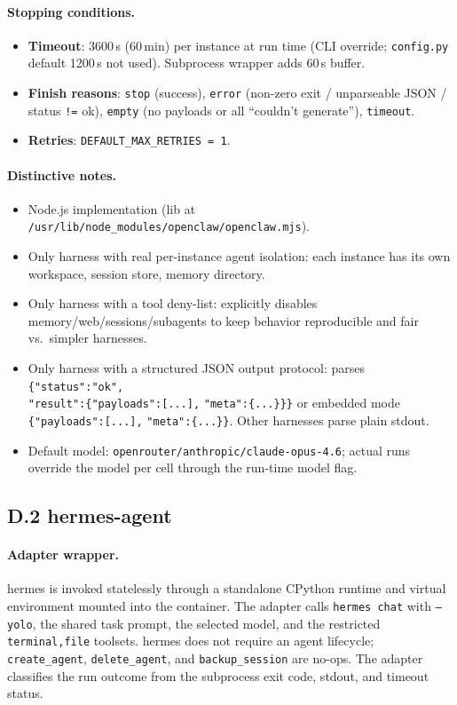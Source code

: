 \paragraph{Stopping conditions.}
\begin{itemize}
  \item \textbf{Timeout}: 3600\,s (60\,min) per instance at run time (CLI override; \texttt{config.py} default 1200\,s not used). Subprocess wrapper adds 60\,s buffer.
  \item \textbf{Finish reasons}: \texttt{stop} (success), \texttt{error} (non-zero exit / unparseable JSON / status \texttt{!=} ok), \texttt{empty} (no payloads or all ``couldn't generate''), \texttt{timeout}.
  \item \textbf{Retries}: \texttt{DEFAULT\_MAX\_RETRIES = 1}.
\end{itemize}

\paragraph{Distinctive notes.}
\begin{itemize}
  \item Node.js implementation (lib at \texttt{/usr/lib/}\allowbreak\texttt{node\_modules/openclaw/openclaw.mjs}).
  \item Only harness with real per-instance agent isolation: each instance has its own workspace, session store, memory directory.
  \item Only harness with a tool deny-list: explicitly disables memory/web/sessions/subagents to keep behavior reproducible and fair vs.\ simpler harnesses.
  \item Only harness with a structured JSON output protocol: parses \texttt{\{"status":"ok",} \\\texttt{"result":\{"payloads":[...],} \texttt{"meta":\{...\}\}\}} or embedded mode \texttt{\{"payloads":[...],} \texttt{"meta":\{...\}\}}. Other harnesses parse plain stdout.
  \item Default model: \texttt{openrouter/anthropic/claude-opus-4.6}; actual runs override the model per cell through the run-time model flag.
\end{itemize}

\subsection*{D.2 hermes-agent}

\paragraph{Adapter wrapper.}
hermes is invoked statelessly through a standalone CPython runtime and virtual environment mounted into the container. The adapter calls \texttt{hermes chat} with \texttt{--yolo}, the shared task prompt, the selected model, and the restricted \texttt{terminal,file} toolsets. hermes does not require an agent lifecycle; \texttt{create\_agent}, \texttt{delete\_agent}, and \texttt{backup\_session} are no-ops. The adapter classifies the run outcome from the subprocess exit code, stdout, and timeout status.


